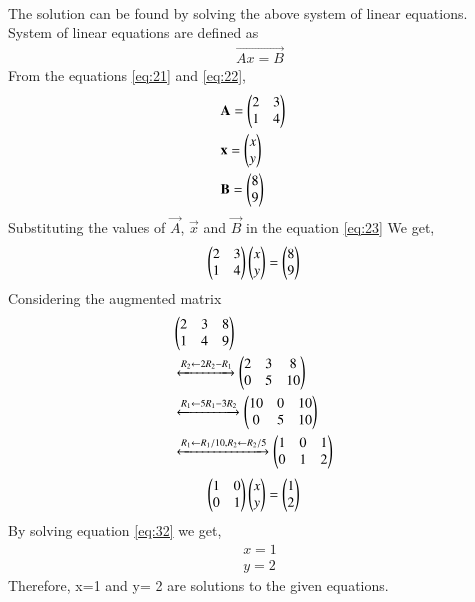 \documentclass[journal,12pt,twocolumn]{IEEEtran}
\renewcommand\thesection{\arabic{section}}
\begin{document}
\begin{enumerate}[label=\thesection.\arabic*.,ref=\thesection.\theenumi]
\begin{align}
\end{align}
The solution can be found by solving the above system of linear equations.\\ 
System of linear equations are defined as 
\begin{align}
\vec{Ax=B} \label{eq:23}
\end{align}
From the equations \eqref{eq:21} and \eqref{eq:22}, 
\begin{align}
&\vec{A}= \myvec{2 &3\\1 & 4}&\\
\medskip
&\vec{x}= \myvec{ x\\ y}&\\
\medskip
&\vec{B}= \myvec{8\\9}&  
\end{align} 
Substituting the values of $\vec{A}$, $\vec{x}$ and $\vec{B}$ in the equation \eqref{eq:23}
We get,
\begin{align}
&\begin{pmatrix}2&3\\1&4\end{pmatrix} \begin{pmatrix}x\\y\end{pmatrix}= \begin{pmatrix}8\\9\end{pmatrix}&
\end{align}
Considering the augmented matrix 
 \begin{align}
& \begin{pmatrix}2&3&8\\1&4&9\end{pmatrix}&
 \\
&\xleftrightarrow[]{ R_2 \leftarrow 2R_2 - R_1}
 \begin{pmatrix}2&3&8\\0&5&10\end{pmatrix}&\\
 &\xleftrightarrow[]{ R_1 \leftarrow 5R_1 - 3R_2}
 \begin{pmatrix}10&0&10\\0&5&10\end{pmatrix}&\\
 &\xleftrightarrow[]{ R_1 \leftarrow R_1/10,R_2\leftarrow R_2/5}
 \begin{pmatrix}1&0&1\\0&1&2\end{pmatrix}&
 \end{align}
 \begin{align}
&\myvec{1&0\\0&1} \myvec{x\\y}= \myvec{1\\2}& \label{eq:32}
\medskip
\end{align}
By solving equation \eqref{eq:32} we get,
\begin{align}
&x=1&\\
&y= 2&
\end{align}
Therefore, x=1 and y= 2 are solutions to the given equations.
\begin{figure}[H]
	\centering

\end{figure}
\end{enumerate}
\end{document}

